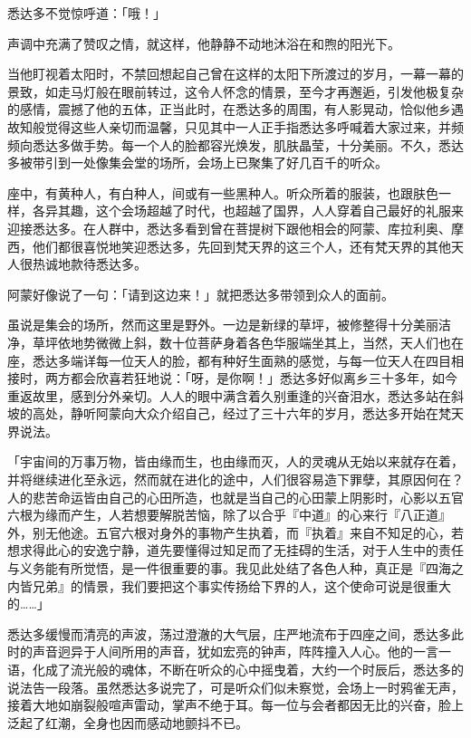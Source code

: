 \documentclass[12pt,twoside,openany]{book}
\begin{document}
悉达多不觉惊呼道：「哦！」

声调中充满了赞叹之情，就这样，他静静不动地沐浴在和煦的阳光下。

当他盯视着太阳时，不禁回想起自己曾在这样的太阳下所渡过的岁月，一幕一幕的景致，如走马灯般在眼前转过，这令人怀念的情景，至今才再邂逅，引发他极复杂的感情，震撼了他的五体，正当此时，在悉达多的周围，有人影晃动，恰似他乡遇故知般觉得这些人亲切而温馨，只见其中一人正手指悉达多呼喊着大家过来，并频频向悉达多做手势。每一个人的脸都容光焕发，肌肤晶莹，十分美丽。不久，悉达多被带引到一处像集会堂的场所，会场上已聚集了好几百千的听众。

座中，有黄种人，有白种人，间或有一些黑种人。听众所着的服装，也跟肤色一样，各异其趣，这个会场超越了时代，也超越了国界，人人穿着自己最好的礼服来迎接悉达多。在人群中，悉达多看到曾在菩提树下跟他相会的阿蒙、库拉利奥、摩西，他们都很喜悦地笑迎悉达多，先回到梵天界的这三个人，还有梵天界的其他天人很热诚地款待悉达多。

阿蒙好像说了一句：「请到这边来！」就把悉达多带领到众人的面前。

虽说是集会的场所，然而这里是野外。一边是新绿的草坪，被修整得十分美丽洁净，草坪依地势微微上斜，数十位菩萨身着各色华服端坐其上，当然，天人们也在座，悉达多端详每一位天人的脸，都有种好生面熟的感觉，与每一位天人在四目相接时，两方都会欣喜若狂地说：「呀，是你啊！」悉达多好似离乡三十多年，如今重返故里，感到分外亲切。人人的眼中满含着久别重逢的兴奋泪水，悉达多站在斜坡的高处，静听阿蒙向大众介绍自己，经过了三十六年的岁月，悉达多开始在梵天界说法。

「宇宙间的万事万物，皆由缘而生，也由缘而灭，人的灵魂从无始以来就存在着，并将继续进化至永远，然而就在进化的途中，人们很容易造下罪孽，其原因何在？人的悲苦命运皆由自己的心田所造，也就是当自己的心田蒙上阴影时，心影以五官六根为缘而产生，人若想要解脱苦恼，除了以合乎『中道』的心来行『八正道』外，别无他途。五官六根对身外的事物产生执着，而『执着』来自不知足的心，若想求得此心的安逸宁静，道先要懂得过知足而了无挂碍的生活，对于人生中的责任与义务能有所觉悟，是一件很重要的事。我见此处结了各色人种，真正是『四海之内皆兄弟』的情景，我们要把这个事实传扬给下界的人，这个使命可说是很重大的……」

悉达多缓慢而清亮的声波，荡过澄澈的大气层，庄严地流布于四座之间，悉达多此时的声音迥异于人间所用的声音，犹如宏亮的钟声，阵阵撞入人心。他的一言一语，化成了流光般的魂体，不断在听众的心中摇曳着，大约一个时辰后，悉达多的说法告一段落。虽然悉达多说完了，可是听众们似未察觉，会场上一时鸦雀无声，接着大地如崩裂般喧声雷动，掌声不绝于耳。每一位与会者都因无比的兴奋，脸上泛起了红潮，全身也因而感动地颤抖不已。
\end{document}
